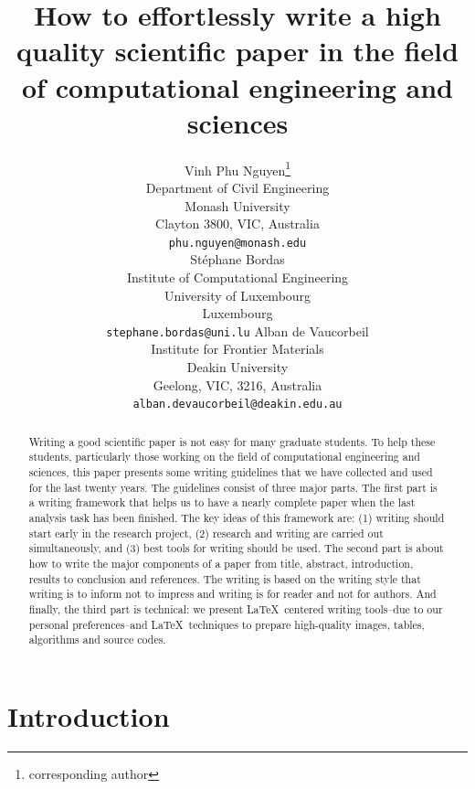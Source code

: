 \documentclass[authoryear,12pta4paper,fleqn]{article}
\title{\textbf{How to effortlessly write a high quality scientific paper in the field of computational engineering and sciences }}
\author{
    Vinh Phu Nguyen\thanks{corresponding author} \\
    Department of Civil Engineering\\
     Monash University\\
     Clayton 3800, VIC, Australia\\
    \texttt{phu.nguyen@monash.edu} \\
    \And
    St\'{e}phane Bordas \\
    Institute of Computational Engineering\\
     University of Luxembourg\\
     Luxembourg\\
    \texttt{stephane.bordas@uni.lu} 
    \And
    Alban de Vaucorbeil\\
    Institute for Frontier Materials\\
    Deakin University\\
    Geelong, VIC, 3216, Australia\\
    \texttt{alban.devaucorbeil@deakin.edu.au} 
}
\numberwithin{equation}{section}
\theoremstyle{remark}
\begin{document}
\maketitle

\begin{abstract}
Writing a good scientific paper is not easy for many graduate students. To help these students, particularly those working on the field of computational engineering and sciences, this paper presents some writing guidelines that we have collected and used for the last twenty years. The guidelines consist of three major parts. The first part is a writing framework that helps us to have a nearly complete paper when the last analysis task has been finished.  The key ideas of this framework are: (1) writing should start early in the research project, (2) research and writing are carried out simultaneously, and (3) best tools for writing should be used.  The second part is about   how to  write the major components of a paper from title, abstract, introduction, results to conclusion and references. The writing is based on the writing style that writing is to inform not to impress and writing is for reader and not for authors. And  finally, the third part is technical:  we present \LaTeX\ centered writing tools--due to our personal preferences--and  \LaTeX\ techniques  to prepare high-quality images, tables, algorithms and source codes. 
\end{abstract}






\tableofcontents

\section{Introduction}

\end{document}

